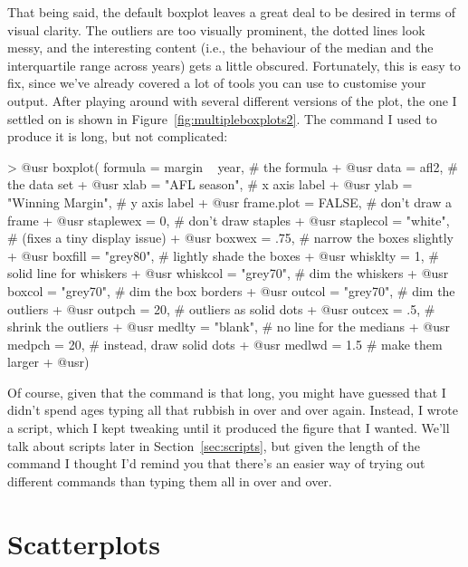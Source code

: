 That being said, the default boxplot leaves a great deal to be desired in terms of visual clarity. The outliers are too visually prominent, the dotted lines look messy, and the interesting content (i.e., the behaviour of the median and the interquartile range across years) gets a little obscured. Fortunately, this is easy to fix, since we've already covered a lot of tools you can use to customise your output. After playing around with several different versions of the plot, the one I settled on is shown in Figure~\ref{fig:multipleboxplots2}. The command I used to produce it is long, but not complicated:
\begin{rblock1}
> @usr{ boxplot( formula =  margin ~ year,}   # the formula
+ @usr{          data = afl2,}                # the data set
+ @usr{          xlab = "AFL season",}        # x axis label
+ @usr{          ylab = "Winning Margin",}    # y axis label
+ @usr{          frame.plot = FALSE,}         # don't draw a frame
+ @usr{          staplewex = 0,}              # don't draw staples
+ @usr{          staplecol = "white",}        # (fixes a tiny display issue)
+ @usr{          boxwex = .75,}               # narrow the boxes slightly
+ @usr{          boxfill = "grey80",}         # lightly shade the boxes
+ @usr{          whisklty = 1,}               # solid line for whiskers 
+ @usr{          whiskcol = "grey70",}        # dim the whiskers
+ @usr{          boxcol = "grey70",}          # dim the box borders
+ @usr{          outcol = "grey70",}          # dim the outliers
+ @usr{          outpch = 20,}                # outliers as solid dots
+ @usr{          outcex = .5,}                # shrink the outliers
+ @usr{          medlty = "blank",}           # no line for the medians
+ @usr{          medpch = 20,}                # instead, draw solid dots
+ @usr{          medlwd = 1.5}                # make them larger
+ @usr{)}
\end{rblock1} 
Of course, given that the command is that long, you might have guessed that I didn't spend ages typing all that rubbish in over and over again. Instead, I wrote a script, which I kept tweaking until it produced the figure that I wanted. We'll talk about scripts later in Section~\ref{sec:scripts}, but given the length of the command I thought I'd remind you that there's an easier way of trying out different commands than typing them all in over and over.



\section{Scatterplots\label{sec:scatterplots}}

